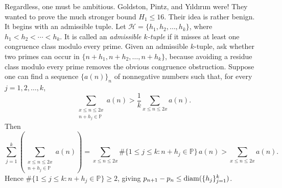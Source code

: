 \documentclass[11pt,a4paper]{article}
\begin{document}
Regardless, one must be ambitious. Goldston, Pintz, and Y{\i}ld{\i}r{\i}m
were! They wanted to prove the much stronger bound $\boxed{H_1\le16}$.
Their idea is rather benign. It begins with an admissible tuple.
Let $\mathcal H=\{h_1,h_2,\ldots,h_k\}$, where $h_1<h_2<\cdots<h_k$.
It is called an \emph{admissible $k$-tuple} if it misses at least one congruence class modulo every prime.
Given an admissible $k$-tuple, ask whether two primes can occur in $\{n+h_1,n+h_2,\ldots,n+h_k\}$, because avoiding a residue class modulo every prime removes the obvious congruence obstruction.
Suppose one can find a sequence $\{a(n)\}_n$ of nonnegative numbers such
that, for every $j=1,2,\ldots,k$,
\begin{equation}
 \sum_{\substack{x\le n\le2x\\n+h_j\in\mathbb P}}a(n)
 >\frac1k\sum_{x\le n\le2x}a(n).
 \tag{$\star$}\label{eq:m5-star}
\end{equation}
Then
\[
 \sum_{j=1}^k\left(\sum_{\substack{x\le n\le2x\\n+h_j\in\mathbb P}}a(n)\right)
 =\sum_{x\le n\le2x}\#\{1\le j\le k:n+h_j\in\mathbb P\}\,a(n)
 >\sum_{x\le n\le2x}a(n).
\]
Hence $\#\{1\le j\le k:n+h_j\in\mathbb P\}\ge2$, giving
$p_{n+1}-p_n\le\operatorname{diam}(\{h_j\}_{j=1}^k)$.
\end{document}
